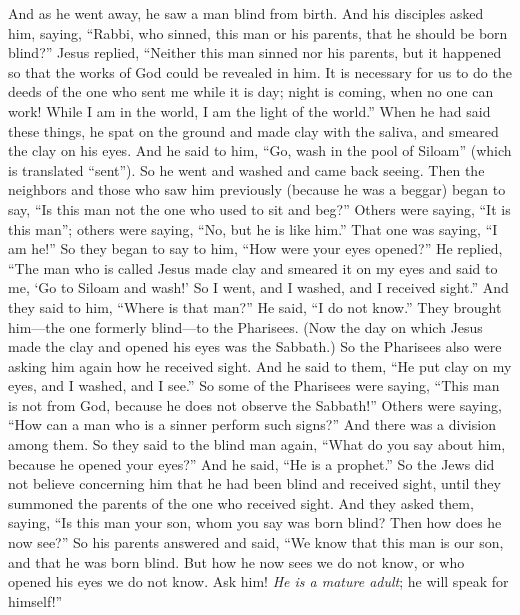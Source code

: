 \begin{biblechapter} %
 And as he went away, he saw a man blind from birth.
\verse And his disciples asked him, saying, “Rabbi, who sinned, this man or his parents, that he should be born blind?”
\verse Jesus replied, “Neither this man sinned nor his parents, but it happened so that the works of God could be revealed in him.
\verse It is necessary for us to do the deeds of the one who sent me while it is day; night is coming, when no one can work!
\verse While I am in the world, I am the light of the world.”
\verse When he had said these things, he spat on the ground and made clay with the saliva, and smeared the clay on his eyes.
\verse And he said to him, “Go, wash in the pool of Siloam” (which is translated “sent”). So he went and washed and came back seeing.
\verse Then the neighbors and those who saw him previously (because he was a beggar) began to say, “Is this man not the one who used to sit and beg?”
\verse Others were saying, “It is this man”; others were saying, “No, but he is like him.” That one was saying, “I am he!”
\verse So they began to say to him, “How were your eyes opened?”
\verse He replied, “The man who is called Jesus made clay and smeared it on my eyes and said to me, ‘Go to Siloam and wash!’ So I went, and I washed, and I received sight.”
\verse And they said to him, “Where is that man?” He said, “I do not know.”
 They brought him—the one formerly blind—to the Pharisees.
\verse (Now the day on which Jesus made the clay and opened his eyes was the Sabbath.)
\verse So the Pharisees also were asking him again how he received sight. And he said to them, “He put clay on my eyes, and I washed, and I see.”
\verse So some of the Pharisees were saying, “This man is not from God, because he does not observe the Sabbath!” Others were saying, “How can a man who is a sinner perform such signs?” And there was a division among them.
\verse So they said to the blind man again, “What do you say about him, because he opened your eyes?” And he said, “He is a prophet.”
\verse So the Jews did not believe concerning him that he had been blind and received sight, until they summoned the parents of the one who received sight.
\verse And they asked them, saying, “Is this man your son, whom you say was born blind? Then how does he now see?”
\verse So his parents answered and said, “We know that this man is our son, and that he was born blind.
\verse But how he now sees we do not know, or who opened his eyes we do not know. Ask him! \textit{He is a mature adult}; he will speak for himself!”

\end{biblechapter}
